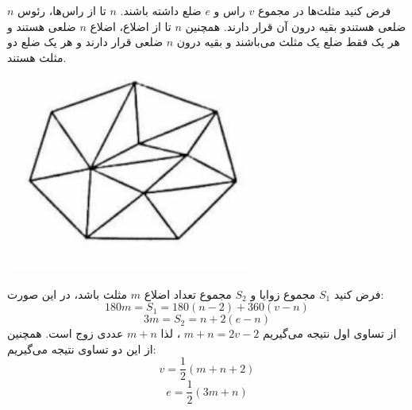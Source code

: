       \p
فرض کنید مثلث‌ها در مجموع
$v$
راس و
$e$
ضلع داشته باشند.
$n$
تا از راس‌ها، رئوس
$n$
ضلعی هستندو بقیه درون آن قرار دارند. همچنین
$n$
تا از اضلاع، اضلاع
$n$
ضلعی هستند و هر یک فقط ضلع یک مثلث می‌باشند و بقیه درون
$n$
ضلعی قرار دارند و هر یک ضلع دو مثلث هستند.
\begin{center}
\includegraphics[height=6.5cm]{1.png}
\end{center}
فرض کنید
$S_1$
مجموع زوایا و
$S_2$
مجموع تعداد اضلاع
$m$
مثلث باشد، در این صورت:
$$180m = S_1 = 180(n - 2) + 360(v - n)$$
$$3m = S_2 = n + 2(e - n)$$
از تساوی اول نتیجه می‌گیریم
$m + n = 2v - 2$ 
، لذا
$m + n$
عددی زوج است. همچنین از این دو تساوی نتیجه می‌گیریم:
$$v = \frac{1}{2}(m + n + 2)$$
$$e = \frac{1}{2}(3m + n)$$       